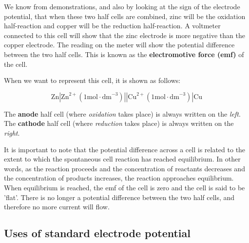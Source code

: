 We know from demonstrations, and also by looking at the sign of the electrode potential, that when these two half cells are combined, zinc will be the oxidation half-reaction and copper will be the reduction half-reaction. A voltmeter connected to this cell will show that the zinc electrode is more negative than the copper electrode. The reading on the meter will show the potential difference between the two half cells. This is known as the \textbf{electromotive force (emf)} of the cell.



When we want to represent this cell, it is shown as follows:

\begin{center}
\begin{equation*}
\text{Zn}|\text{Zn}^{2+} (1 \text{mol} \cdot \text{dm}^{-3})||\text{Cu}^{2+} (1 \text{mol} \cdot \text{dm}^{-3})|\text{Cu}
\end{equation*}
\end{center}

The \textbf{anode} half cell (where \textit{oxidation} takes place) is always written on the \textit{left}. The \textbf{cathode} half cell (where \textit{reduction} takes place) is always written on the \textit{right}.

It is important to note that the potential difference across a cell is related to the extent to which the spontaneous cell reaction has reached equilibrium. In other words, as the reaction proceeds and the concentration of reactants decreases and the concentration of products increases, the reaction approaches equilibrium. When equilibrium is reached, the emf of the cell is zero and the cell is said to be 'flat'. There is no longer a potential difference between the two half cells, and therefore no more current will flow. 

\subsection{Uses of standard electrode potential}
\label{subsec:electrochemical:uses of sep}

